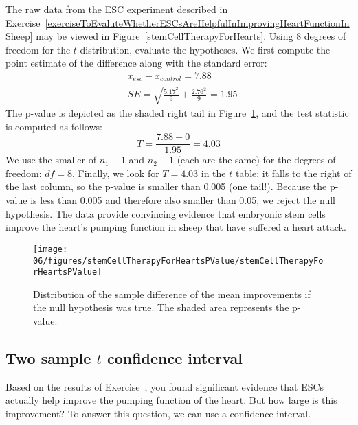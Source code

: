 \begin{example}{The raw data from the ESC experiment described in Exercise~\ref{exerciseToEvaluteWhetherESCsAreHelpfulInImprovingHeartFunctionInSheep} may be viewed in Figure~\ref{stemCellTherapyForHearts}. Using 8 degrees of freedom for the $t$ distribution, evaluate the hypotheses.}
We first compute the point estimate of the difference along with the standard error:
\begin{align*}
& \bar{x}_{esc} - \bar{x}_{control} = 7.88 \\
& SE = \sqrt{\frac{5.17^2}{9} + \frac{2.76^2}{9}} = 1.95
\end{align*}
The p-value is depicted as the shaded right tail in Figure~\ref{stemCellTherapyForHeartsPValue}, and the test statistic is computed as follows:
$$T = \frac{7.88 - 0}{1.95} = 4.03$$
We use the smaller of $n_1-1$ and $n_2-1$ (each are the same) for the degrees of freedom: $df=8$. Finally, we look for $T=4.03$ in the $t$ table; it falls to the right of the last column, so the p-value is smaller than 0.005 (one tail!). Because the p-value is less than 0.005 and therefore also smaller than 0.05, we reject the null hypothesis. The data provide convincing evidence that embryonic stem cells improve the heart's pumping function in sheep that have suffered a heart attack.
\end{example}

\begin{figure}
\centering
\texttt{[image: 06/figures/stemCellTherapyForHeartsPValue/stemCellTherapyForHeartsPValue]}
\caption{Distribution of the sample difference of the mean improvements if the null hypothesis was true. The shaded area represents the p-value.}
\label{stemCellTherapyForHeartsPValue}
\end{figure}

\subsection{Two sample $t$ confidence interval}

Based on the results of Exercise~, you found significant evidence that ESCs actually help improve the pumping function of the heart. But how large is this improvement? To answer this question, we can use a confidence interval. 

